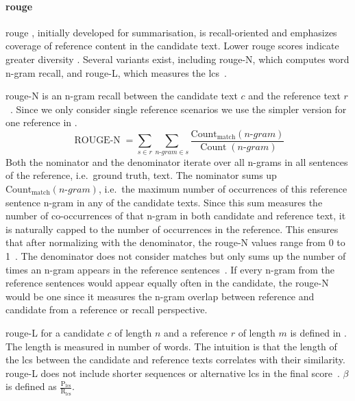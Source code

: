 
\paragraph{\ac{rouge}}
\ac{rouge} \citep{lin_rouge_2004}, initially developed for summarisation, is recall-oriented and emphasizes coverage of reference content in the candidate text. 
Lower \ac{rouge} scores indicate greater diversity \citep{kurt_pehlivanoglu_comparative_2024}.
Several variants exist, including \ac{rouge}-N, which computes word n-gram recall, and \ac{rouge}-L, which measures the \ac{lcs}~\citep{zhou_paraphrase_2021,palivela_optimization_2021,kurt_pehlivanoglu_comparative_2024}. 

\ac{rouge}-N is an n-gram recall between the candidate text $c$ and the reference text $r$~\citep{lin_rouge_2004}.
Since we only consider single reference scenarios we use the simpler version for one reference in .
\begin{equation}
    \operatorname{ROUGE-N} = \sum_{s \in r}\sum_{n \text{-} gram \in s} \frac{\operatorname{Count_{match}}(n \text{-} gram)}{\operatorname{Count}(n \text{-} gram)}
\label{eq:rouge_n}
\end{equation}
Both the nominator and the denominator iterate over all n-grams in all sentences of the reference, i.e.\ ground truth, text.
The nominator sums up $\operatorname{Count_{match}}(n \text{-} gram)$, i.e.\ the maximum number of occurrences of this reference sentence n-gram in any of the candidate texts.
Since this sum measures the number of co-occurrences of that n-gram in both candidate and reference text, it is naturally capped to the number of occurrences in the reference.
This ensures that after normalizing with the denominator, the \ac{rouge}-N values range from 0 to 1~\citep{kurt_pehlivanoglu_comparative_2024}.
The denominator does not consider matches but only sums up the number of times an n-gram appears in the reference sentences~\citep{lin_rouge_2004}.
If every n-gram from the reference sentences would appear equally often in the candidate, the \ac{rouge}-N would be one since it measures the n-gram overlap between reference and candidate from a reference or recall perspective.

\ac{rouge}-L for a candidate $c$ of length $n$ and a reference $r$ of length $m$ is defined in .
The length is measured in number of words.
The intuition is that the length of the \ac{lcs} between the candidate and reference texts correlates with their similarity.
\ac{rouge}-L does not include shorter sequences or alternative \ac{lcs} in the final score~\citep{lin_rouge_2004}.
$\beta$ is defined as $\frac{\mathrm{P_{lcs}}}{\mathrm{R_{lcs}}}$.

